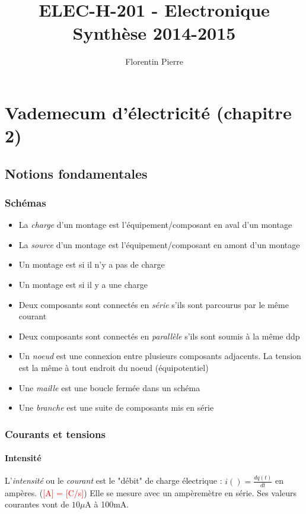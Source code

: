 \documentclass[a4paper]{article}
\title{
    ELEC-H-201 - Electronique\\
    \small Synthèse 2014-2015
}
\author{Florentin \bsc{Hennecker} Pierre \bsc{Gérard}}
\date{}
\begin{document}
\maketitle
\tableofcontents

\section{Vademecum d'électricité (chapitre 2)}

    \subsection{Notions fondamentales}

    \subsubsection{Schémas}
    \begin{itemize}
        \item La \textit{charge} d'un montage est l'équipement/composant en aval d'un montage
        \item La \textit{source} d'un montage est l'équipement/composant en amont d'un montage
        \item Un montage est  si il n'y a pas de charge
        \item Un montage est  si il y a une charge
        \item Deux composants sont connectés en \textit{série} s'ils sont parcourus par le même courant
        \item Deux composants sont connectés en \textit{parallèle} s'ils sont soumis à la même ddp
        \item Un \textit{noeud} est une connexion entre plusieurs composants adjacents. La tension est la même à tout endroit du noeud (équipotentiel)
        \item Une \textit{maille} est une boucle fermée dans un schéma
        \item Une \textit{branche} est une suite de composants mis en série
    \end{itemize}

    \subsubsection{Courants et tensions}

    \paragraph{Intensité} L'\textit{intensité} ou le \textit{courant} 
    est le "débit" de charge électrique : $i() = \frac{dq(t)}{dt}$ en ampères. 
    (\textcolor{red}{[A] = [C/s]}) Elle se mesure avec un ampèremètre en série.
    Ses valeurs courantes vont de $10\mu$A à 100mA.\\
\end{document}
